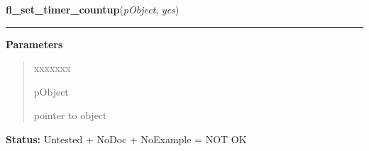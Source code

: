 \hspace{.8\funcindent}\begin{boxedminipage}{\funcwidth}

    \raggedright \textbf{fl\_set\_timer\_countup}(\textit{pObject}, \textit{yes})

    \vspace{-1.5ex}

    \rule{\textwidth}{0.5\fboxrule}
\setlength{\parskip}{2ex}
\setlength{\parskip}{1ex}
      \textbf{Parameters}
      \vspace{-1ex}

      \begin{quote}
        \begin{Ventry}{xxxxxxx}

          \item[pObject]

          pointer to object

        \end{Ventry}

      \end{quote}

\textbf{Status:} Untested + NoDoc + NoExample = NOT OK



    \end{boxedminipage}

    \label{xformslib:library:fl_set_timer_filter}

    \vspace{0.5ex}

